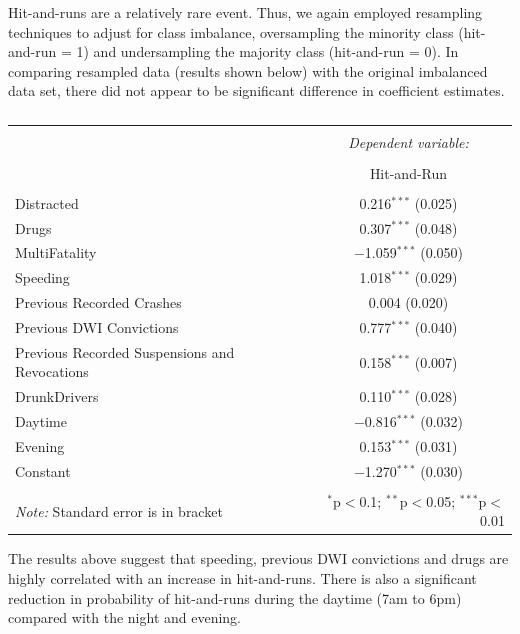 \documentclass[11pt, oneside,titlepage]{article}   	%
\begin{document}
Hit-and-runs are a relatively rare event. Thus, we again employed resampling techniques to adjust for class imbalance, oversampling the minority class (hit-and-run = 1) and undersampling the majority class (hit-and-run = 0). In comparing resampled data (results shown below) with the original imbalanced data set, there did not appear to be significant difference in coefficient estimates.

\begin{table}[!htbp] \centering 
	\caption{} 
	\label{} 
	\begin{tabular}{@{\extracolsep{5pt}}lc} 
		\\[-1.8ex]\hline 
		\hline \\[-1.8ex] 
		& \multicolumn{1}{c}{\textit{Dependent variable:}} \\ 
		\cline{2-2} 
		\\[-1.8ex] & Hit-and-Run \\ 
		\hline \\[-1.8ex] 
		Distracted & 0.216$^{***}$ (0.025) \\ 
		Drugs & 0.307$^{***}$ (0.048) \\ 
		MultiFatality & $-$1.059$^{***}$ (0.050) \\ 
		Speeding & 1.018$^{***}$ (0.029) \\ 
		Previous Recorded Crashes & 0.004 (0.020) \\ 
		Previous DWI Convictions & 0.777$^{***}$ (0.040) \\ 
		Previous Recorded Suspensions and Revocations & 0.158$^{***}$ (0.007) \\ 
		DrunkDrivers & 0.110$^{***}$ (0.028) \\ 
		Daytime & $-$0.816$^{***}$ (0.032) \\ 
		Evening & 0.153$^{***}$ (0.031) \\ 
		Constant & $-$1.270$^{***}$ (0.030) \\  
		\hline \\[-1.8ex] 
		\textit{Note:} Standard error is in bracket & \multicolumn{1}{r}{$^{*}$p$<$0.1; $^{**}$p$<$0.05; $^{***}$p$<$0.01} \\ 
	\end{tabular} 
\end{table} 

The results above suggest that speeding, previous DWI convictions and drugs are highly correlated with an increase in hit-and-runs. There is also a significant reduction in probability of hit-and-runs during the daytime (7am to 6pm) compared with the night and evening.
\end{document}
